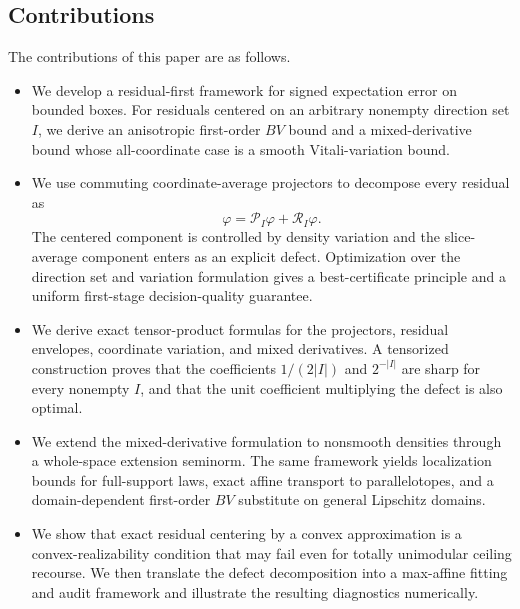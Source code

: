 \documentclass[11pt,letterpaper]{article}
\theoremstyle{definition}
\theoremstyle{remark}
\begin{document}
\subsection*{Contributions } 

The contributions of this paper are as follows.

\begin{itemize}
\item We develop a residual-first framework for signed expectation error on
bounded boxes. For residuals centered on an arbitrary nonempty direction set
$I$, we derive an anisotropic first-order $BV$ bound and a mixed-derivative
bound whose all-coordinate case is a smooth Vitali-variation bound.

\item We use commuting coordinate-average projectors to decompose every
residual as
$$
\varphi=\mathcal P_I\varphi+\mathcal R_I\varphi.
$$
The centered component is controlled by density variation and the
slice-average component enters as an explicit defect. Optimization over the
direction set and variation formulation gives a best-certificate principle and a
uniform first-stage decision-quality guarantee.

\item We derive exact tensor-product formulas for the projectors, residual
envelopes, coordinate variation, and mixed derivatives. A tensorized
construction proves that the coefficients $1/(2|I|)$ and $2^{-|I|}$ are sharp
for every nonempty $I$, and that the unit coefficient multiplying the defect
is also optimal.

\item We extend the mixed-derivative formulation to nonsmooth densities through a
whole-space extension seminorm. The same framework yields localization bounds
for full-support laws, exact affine transport to parallelotopes, and a
domain-dependent first-order $BV$ substitute on general Lipschitz domains.

\item We show that exact residual centering by a convex approximation is a
convex-realizability condition that may fail even for totally unimodular
ceiling recourse. We then translate the defect decomposition into a max-affine
fitting and audit framework and illustrate the resulting diagnostics
numerically.
\end{itemize}
\end{document}
